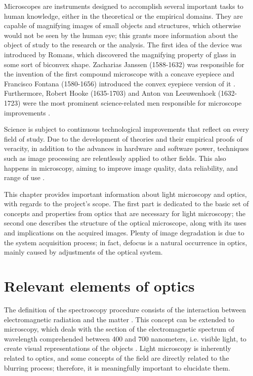 Microscopes are instruments designed to accomplish several important tasks to human knowledge, either in the theoretical or the empirical domains. They are capable of magnifying images of small objects and structures, which otherwise would not be seen by the human eye; this grants more information about the object of study to the research or the analysis. The first idea of the device was introduced by Romans, which discovered the magnifying property of glass in some sort of biconvex shape. Zacharias Janssen (1588-1632) was responsible for the invention of the first compound microscope with a concave eyepiece and  Francisco Fontana (1580-1656) introduced the convex eyepiece version of it \cite{zilio2009optica}. Furthermore, Robert Hooke (1635-1703) and Anton van Leeuwenhoek (1632-1723) were the most prominent science-related men responsible for microscope improvements \cite{wu2008microscope}.

Science is subject to continuous technological improvements that reflect on every field of study. Due to the development of theories and their empirical proofs of veracity, in addition to the advances in hardware and software power, techniques such as image processing are relentlessly applied to other fields. This also happens in microscopy, aiming to improve image quality, data reliability, and range of use \cite{boyde1990modern}.

This chapter provides important information about light microscopy and optics, with regards to the project's scope. The first part is dedicated to the basic set of concepts and properties from optics that are necessary for light microscopy; the second one describes the structure of the optical microscope, along with its uses and implications on the acquired images. Plenty of image degradation is due to the system acquisition process; in fact, defocus is a natural occurrence in optics, mainly caused by adjustments of the optical system.

\section{Relevant elements of optics}

The definition of the spectroscopy procedure consists of the interaction between electromagnetic radiation and the matter \cite{gauglitz2006handbook}. This concept can be extended to microscopy, which deals with the section of the electromagnetic spectrum of wavelength comprehended between 400 and 700 nanometers, i.e. visible light,  to create visual representations of the objects
\cite{bell2009introduction}. Light microscopy is inherently related to optics, and some concepts of the field are directly related to the blurring process; therefore, it is meaningfully important to elucidate them.

